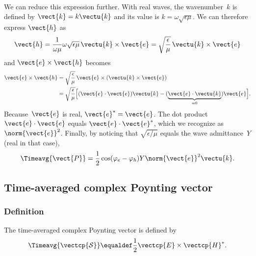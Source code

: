 We can reduce this expression further.
With real waves, the wavenumber~$k$ is defined by $\vect{k} = k \vectu{k}$ and its value is $k=\omega \sqrt{\epsilon \mu}$.
We can therefore express $\vect{h}$ as
\begin{equation}
    \vect{h}
    = \frac{1}{\omega \mu} \omega \sqrt{\epsilon \mu} \, \vectu{k} \times \vect{e}
    = \sqrt{\frac{\epsilon}{\mu}} \, \vectu{k} \times \vect{e}
\end{equation}
and $\vect{e} \times \vect{h}$ becomes
\begin{subequations}
    \begin{align}
        \vect{e} \times \vect{h}
        &=
        \sqrt{\frac{\epsilon}{\mu}} \, \vect{e} \times (\vectu{k} \times \vect{e})
        \\
        &=
        \sqrt{\frac{\epsilon}{\mu}}
        \Big[
            (\vect{e} \cdot \vect{e})\vectu{k}
            -
            (
                \underbrace{\vect{e} \cdot \vectu{k}}_{=0}
            )\vect{e}
        \Big]
        \text{.}
    \end{align}
\end{subequations}
Because~$\vect{e}$ is real, $\vect{e}^*=\vect{e}$.
The dot product $\vect{e}\cdot\vect{e}$ equals $\vect{e}\cdot\vect{e}^*$, which we recognize as~$\norm{\vect{e}}^2$.
Finally, by noticing that $\sqrt{\epsilon/\mu}$ equals the wave admittance~$Y$ (real in that case),
\begin{equation}
    \Timeavg{\vect{P}}
    =
    \frac{1}{2} \cos(\varphi_e - \varphi_h) 
    Y %
    \norm{\vect{e}}^2
    \vectu{k}
    \text{.}
    \label{eq:poynting_real}
\end{equation}





\subsection{Time-averaged complex Poynting vector}
\label{sec:time_averaged_complex_poynting_vector}




\subsubsection{Definition}
The time-averaged complex Poynting vector is defined by
\begin{equation}
    \Timeavg{\vectcp{\mathcal{S}}}
    \equaldef
    \frac{1}{2} \vectcp{E} \times \vectcp{H}^*
    \text{.}
    \label{eq:poynting_complex_def}
\end{equation}



